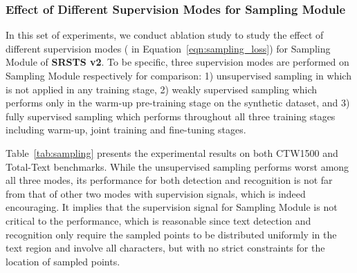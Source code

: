 \subsubsection{Effect of Different Supervision Modes for Sampling Module}
In this set of experiments, we conduct ablation study to study the effect of different supervision modes ( in Equation~\ref{eqn:sampling_loss}) for Sampling Module of \textbf{SRSTS v2}. To be specific, three supervision modes are performed on Sampling Module respectively for comparison: 1) unsupervised sampling in which  is not applied in any training stage, 2) weakly supervised sampling which performs  only in the warm-up pre-training stage on the synthetic dataset, and 3) fully supervised sampling which performs  throughout all three training stages including warm-up, joint training and fine-tuning stages. 

Table~\ref{tab:sampling} presents the experimental results on both CTW1500 and Total-Text benchmarks. While the unsupervised sampling performs worst among all three modes, its performance for both detection and recognition is not far from that of other two modes with supervision signals, which is indeed encouraging. It implies that the supervision signal for Sampling Module is not critical to the performance, which is reasonable since text detection and recognition only require the sampled points to be distributed uniformly in the text region and involve all characters, but with no strict constraints for the location of sampled points.


